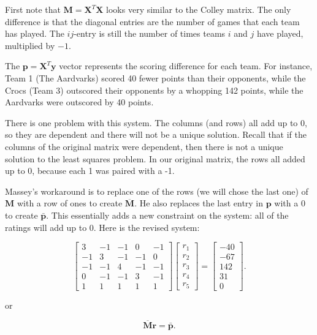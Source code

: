 \documentclass[
]{book}
\theoremstyle{definition}
\theoremstyle{definition}
\theoremstyle{definition}
\theoremstyle{definition}
\theoremstyle{remark}
\begin{document}
First note that \(\mathbf{M}=\mathbf{X}^T\mathbf{X}\) looks very similar to the Colley matrix. The only difference is that the diagonal entries are the number of games that each team has played. The \(ij\)-entry is still the number of times teams \(i\) and \(j\) have played, multiplied by \(-1\).

The \(\mathbf{p}=\mathbf{X}^T\mathbf{y}\) vector represents the scoring difference for each team. For instance, Team 1 (The Aardvarks) scored 40 fewer points than their opponents, while the Crocs (Team 3) outscored their opponents by a whopping 142 points, while the Aardvarks were outscored by 40 points.

There is one problem with this system. The columns (and rows) all add up to 0, so they are dependent and there will not be a unique solution. Recall that if the columns of the original matrix were dependent, then there is not a unique solution to the least squares problem. In our original matrix, the rows all added up to 0, because each 1 was paired with a -1.

Massey's workaround is to replace one of the rows (we will chose the last one) of \(\mathbf{M}\) with a row of ones to create \(\overline{\mathbf{M}}\). He also replaces the last entry in \(\mathbf{p}\) with a 0 to create \(\bar{\mathbf{p}}\). This essentially adds a new constraint on the system: all of the ratings will add up to 0. Here is the revised system:

\[\left[\begin{array}{rrrrr}3 & -1 & -1 & 0 & -1\\-1 & 3 & -1 & -1 & 0\\-1 & -1 & 4 & -1 & -1\\0 & -1 & -1 & 3 & -1\\1 & 1 & 1 & 1 & 1\end{array}\right]\begin{bmatrix}r_1\\r_2\\r_3\\r_4\\r_5\end{bmatrix}=\left[\begin{array}{r}-40\\-67\\142\\31\\0\end{array}\right].\]

or

\[\overline{\mathbf{M}}\mathbf{r}=\bar{\mathbf{p}}.\]
\end{document}
